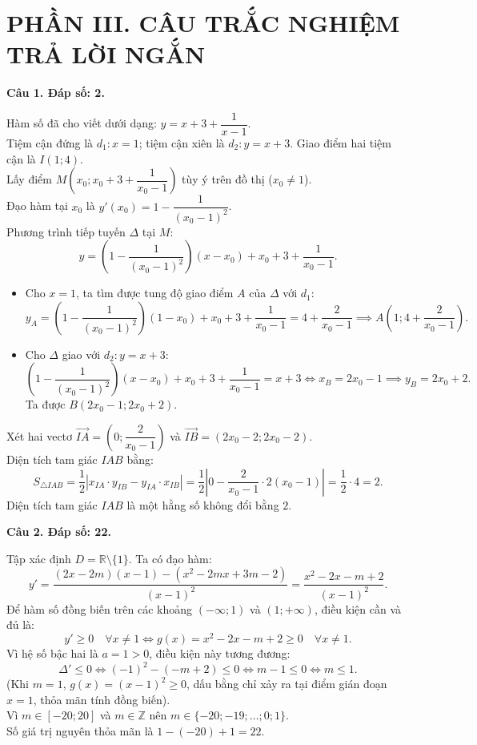 \documentclass[12pt,a4paper]{article}
\newcommand{\loigiai}[1]{\par\medskip\Needspace{4\baselineskip}\noindent\textbf{#1}\par\nobreak}
\begin{document}
\section*{\large PHẦN III. CÂU TRẮC NGHIỆM TRẢ LỜI NGẮN}
\loigiai{Câu 1. Đáp số: 2.}
Hàm số đã cho viết dưới dạng: $y = x + 3 + \dfrac{1}{x - 1}$.\\
Tiệm cận đứng là $d_1: x = 1$; tiệm cận xiên là $d_2: y = x + 3$. Giao điểm hai tiệm cận là $I(1; 4)$.\\
Lấy điểm $M\left(x_0; x_0 + 3 + \dfrac{1}{x_0 - 1}\right)$ tùy ý trên đồ thị ($x_0 \neq 1$).\\
Đạo hàm tại $x_0$ là $y'(x_0) = 1 - \dfrac{1}{(x_0 - 1)^2}$.\\
Phương trình tiếp tuyến $\Delta$ tại $M$:
\[y = \left(1 - \dfrac{1}{(x_0 - 1)^2}\right)(x - x_0) + x_0 + 3 + \dfrac{1}{x_0 - 1}.\]
\begin{itemize}
\item Cho $x = 1$, ta tìm được tung độ giao điểm $A$ của $\Delta$ với $d_1$:
\[y_A = \left(1 - \dfrac{1}{(x_0 - 1)^2}\right)(1 - x_0) + x_0 + 3 + \dfrac{1}{x_0 - 1} = 4 + \dfrac{2}{x_0 - 1} \implies A\left(1; 4 + \dfrac{2}{x_0 - 1}\right).\]
\item Cho $\Delta$ giao với $d_2: y = x + 3$:
\[\left(1 - \dfrac{1}{(x_0 - 1)^2}\right)(x - x_0) + x_0 + 3 + \dfrac{1}{x_0 - 1} = x + 3 \iff x_B = 2x_0 - 1 \implies y_B = 2x_0 + 2.\]
Ta được $B(2x_0 - 1; 2x_0 + 2)$.
\end{itemize}
Xét hai vectơ $\vec{IA} = \left(0; \dfrac{2}{x_0 - 1}\right)$ và $\vec{IB} = (2x_0 - 2; 2x_0 - 2)$.\\
Diện tích tam giác $IAB$ bằng:
\[S_{\triangle IAB} = \dfrac{1}{2}\left|x_{IA} \cdot y_{IB} - y_{IA} \cdot x_{IB}\right| = \dfrac{1}{2}\left|0 - \dfrac{2}{x_0 - 1} \cdot 2(x_0 - 1)\right| = \dfrac{1}{2} \cdot 4 = 2.\]
Diện tích tam giác $IAB$ là một hằng số không đổi bằng $2$.

\loigiai{Câu 2. Đáp số: 22.}
Tập xác định $D = \mathbb{R} \setminus \{1\}$. Ta có đạo hàm:
\[y' = \dfrac{(2x - 2m)(x - 1) - (x^2 - 2mx + 3m - 2)}{(x - 1)^2} = \dfrac{x^2 - 2x - m + 2}{(x - 1)^2}.\]
Để hàm số đồng biến trên các khoảng $(-\infty; 1)$ và $(1; +\infty)$, điều kiện cần và đủ là:
\[y' \ge 0 \quad \forall x \neq 1 \iff g(x) = x^2 - 2x - m + 2 \ge 0 \quad \forall x \neq 1.\]
Vì hệ số bậc hai là $a = 1 > 0$, điều kiện này tương đương:
\[\Delta' \le 0 \iff (-1)^2 - (-m + 2) \le 0 \iff m - 1 \le 0 \iff m \le 1.\]
(Khi $m = 1$, $g(x) = (x - 1)^2 \ge 0$, dấu bằng chỉ xảy ra tại điểm gián đoạn $x = 1$, thỏa mãn tính đồng biến).\\
Vì $m \in [-20; 20]$ và $m \in \mathbb{Z}$ nên $m \in \{-20; -19; \dots; 0; 1\}$.\\
Số giá trị nguyên thỏa mãn là $1 - (-20) + 1 = 22$.
\end{document}
